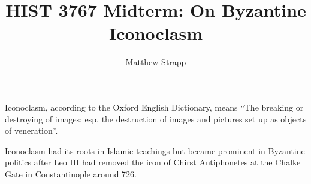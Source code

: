 \documentclass{article}
\title{HIST 3767 Midterm: On Byzantine Iconoclasm}
\author{Matthew Strapp}
\begin{document}
\begin{singlespace}
    \maketitle
\end{singlespace}
    Iconoclasm, according to the Oxford English Dictionary, means ``The breaking or destroying of images; esp. the destruction of images and pictures set up as objects of veneration''\cite{oed:iconoclasm}.

    Iconoclasm had its roots in Islamic teachings but became prominent in Byzantine politics after Leo III had removed the icon of Chirst Antiphonetes at the Chalke Gate in Constantinople around 726. \cite{LeoJour} 

    
    
\end{document}
